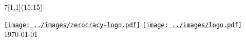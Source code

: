 \documentclass{deck}
\begin{document}
\begin{textblock}{7}[1,1](15,15){\begin{flushright}
  \ttfamily\small\color{gray}
  \href{https://www.zerocracy.com}{\texttt{[image: ../images/zerocracy-logo.pdf]}}
  \href{https://www.zold.io}{\texttt{[image: ../images/logo.pdf]}}\\
  \today\quad\zoldversion
\end{flushright}}\end{textblock}
\end{document}
